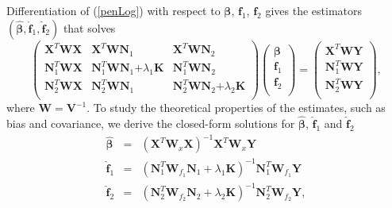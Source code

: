 \documentclass[article,lineno]{biometrika}
\begin{document}
Differentiation of (\ref{penLog}) with respect to $\boldsymbol \beta$, $\boldsymbol f_1$, $\boldsymbol f_2$ gives the estimators 
$(\boldsymbol {\hat \beta}, \boldsymbol {\hat f}_1, \boldsymbol {\hat f}_2)$ that solves
\begin{equation} \label{normalMatrix}
 \begin{pmatrix}
  \boldsymbol X^T  \boldsymbol W \boldsymbol X & \boldsymbol X^T  \boldsymbol W \boldsymbol N_1 & \boldsymbol X^T  \boldsymbol W \boldsymbol N_2 \\
   \boldsymbol N_1^T  \boldsymbol W\boldsymbol X & \boldsymbol N_1^T  \boldsymbol W \boldsymbol N_1 \boldsymbol 
 + \lambda_1 \boldsymbol K &  \boldsymbol N_1^T  \boldsymbol W \boldsymbol N_2  \\
  \boldsymbol N_2^T  \boldsymbol W\boldsymbol X &  \boldsymbol N_2^T  \boldsymbol W \boldsymbol N_1 & \boldsymbol N_2^T  \boldsymbol W \boldsymbol N_2 \boldsymbol 
 +
  \lambda_2 \boldsymbol K \\
 \end{pmatrix}
  \begin{pmatrix}
   \boldsymbol \beta \\
 \boldsymbol f_1 \\
 \boldsymbol f_2\\
 \end{pmatrix}
  =
 \begin{pmatrix}
   \boldsymbol X^T  \boldsymbol W \boldsymbol Y \\
   \boldsymbol N_1^T  \boldsymbol W \boldsymbol Y  \\
  \boldsymbol N_2^T  \boldsymbol W \boldsymbol Y  \\
 \end{pmatrix},
 \end{equation}
where $\boldsymbol W = \boldsymbol V^{-1}$.
To study the theoretical properties of the estimates, such as bias and covariance, we derive the closed-form solutions  for $\boldsymbol {\hat \beta}$, $\boldsymbol {\hat f}_1$ and $\boldsymbol {\hat f}_2$
\begin{eqnarray}
 \boldsymbol {\hat \beta} 
  &=&
 (\boldsymbol X^T  \boldsymbol W_x \boldsymbol X )^{-1} \boldsymbol X^T  \boldsymbol W_x \boldsymbol Y 
\label{betaHat} \\
 \boldsymbol {\hat f}_1
   &=&
  (\boldsymbol N_1^T 
\boldsymbol W_{f_1}  \boldsymbol N_1
  + \lambda_1 \boldsymbol K)^{-1}  \boldsymbol N_1^T \boldsymbol W_{f_1} \boldsymbol Y
\label{f1Hat} \\
  \boldsymbol {\hat f}_2 
  &=&
 (\boldsymbol N_2^T 
\boldsymbol W_{f_2}  \boldsymbol N_2
  + \lambda_2 \boldsymbol K)^{-1}  \boldsymbol N_2^T \boldsymbol W_{f_2} \boldsymbol Y,
\label{f2Hat}
\end{eqnarray}
\end{document}
